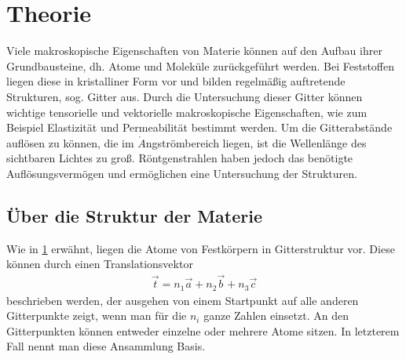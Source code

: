 

\section{Theorie}\label{sec:theorie}
Viele makroskopische Eigenschaften von Materie können auf den Aufbau ihrer Grundbausteine, dh. Atome und Moleküle zurückgeführt werden. Bei Feststoffen liegen diese in kristalliner Form vor und bilden regelmäßig auftretende Strukturen, sog. Gitter aus. Durch die Untersuchung dieser Gitter können wichtige tensorielle und vektorielle makroskopische Eigenschaften, wie zum Beispiel Elastizität und Permeabilität bestimmt werden. Um die Gitterabstände auflösen zu können, die im $\mathring{A}$ngströmbereich liegen, ist die Wellenlänge des sichtbaren Lichtes zu groß. Röntgenstrahlen haben jedoch das benötigte Auflösungsvermögen und ermöglichen eine Untersuchung der Strukturen.

\subsection{Über die Struktur der Materie}
Wie in \ref{sec:theorie} erwähnt, liegen die Atome von Festkörpern in Gitterstruktur vor. Diese können durch einen Translationsvektor
\begin{align}
	\vec{t} = n_1\vec{a} +n_2\vec{b} + n_3\vec{c}
\end{align}
beschrieben werden, der ausgehen von einem Startpunkt auf alle anderen Gitterpunkte zeigt, wenn man für die $n_i$ ganze Zahlen einsetzt. An den Gitterpunkten können entweder einzelne oder mehrere Atome sitzen. In letzterem Fall nennt man diese Ansammlung Basis. 

